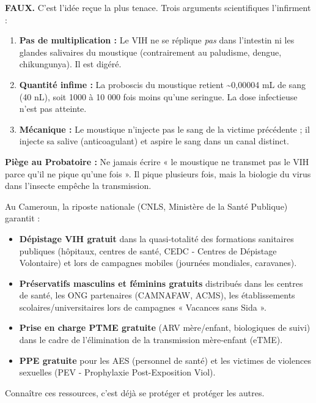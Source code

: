 \documentclass[11pt]{article}
\begin{document}
\begin{attention}
\textbf{FAUX.} C'est l'idée reçue la plus tenace. Trois arguments scientifiques l'infirment :
\begin{enumerate}
    \item \textbf{Pas de multiplication :} Le VIH ne se réplique \emph{pas} dans l'intestin ni les glandes salivaires du moustique (contrairement au paludisme, dengue, chikungunya). Il est digéré.
    \item \textbf{Quantité infime :} La proboscis du moustique retient \textasciitilde 0,00004 mL de sang (40 nL), soit 1000 à 10 000 fois moins qu'une seringue. La dose infectieuse n'est pas atteinte.
    \item \textbf{Mécanique :} Le moustique n'injecte pas le sang de la victime précédente ; il injecte sa salive (anticoagulant) et aspire le sang dans un canal distinct.
\end{enumerate}
\textbf{Piège au Probatoire :} Ne jamais écrire « le moustique ne transmet pas le VIH parce qu'il ne pique qu'une fois ». Il pique plusieurs fois, mais la biologie du virus dans l'insecte empêche la transmission.
\end{attention}

\begin{savaistu}
Au Cameroun, la riposte nationale (CNLS, Ministère de la Santé Publique) garantit :
\begin{itemize}
    \item \textbf{Dépistage VIH gratuit} dans la quasi-totalité des formations sanitaires publiques (hôpitaux, centres de santé, CEDC - Centres de Dépistage Volontaire) et lors de campagnes mobiles (journées mondiales, caravanes).
    \item \textbf{Préservatifs masculins et féminins gratuits} distribués dans les centres de santé, les ONG partenaires (CAMNAFAW, ACMS), les établissements scolaires/universitaires lors de campagnes « Vacances sans Sida ».
    \item \textbf{Prise en charge PTME gratuite} (ARV mère/enfant, biologiques de suivi) dans le cadre de l'élimination de la transmission mère-enfant (eTME).
    \item \textbf{PPE gratuite} pour les AES (personnel de santé) et les victimes de violences sexuelles (PEV - Prophylaxie Post-Exposition Viol).
\end{itemize}
Connaître ces ressources, c'est déjà se protéger et protéger les autres.
\end{savaistu}
\end{document}
